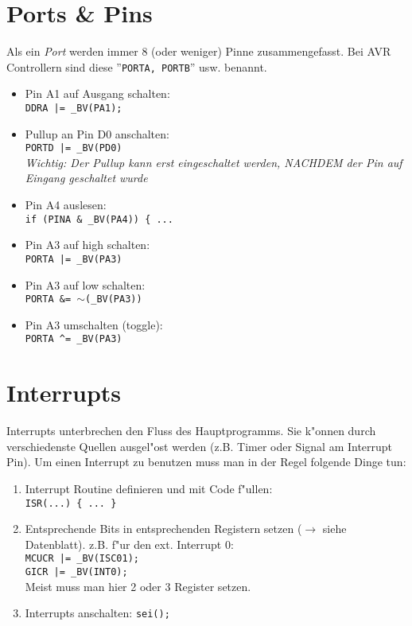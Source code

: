 \documentclass[11pt,a4paper,smallheadings,twocolumn,headexclude,footexclude]{scrartcl}
\begin{document}
\section*{Ports \& Pins}
Als ein \emph{Port} werden immer 8 (oder weniger) Pinne zusammengefasst. Bei AVR Controllern
sind diese ''\texttt{PORTA, PORTB}'' usw. benannt.
\begin{itemize}
	\item Pin A1 auf Ausgang schalten:\\\texttt{DDRA |= \_BV(PA1);}
	\item Pullup an Pin D0 anschalten: \\\texttt{PORTD |= \_BV(PD0)}
		\\\emph{Wichtig: Der Pullup kann erst eingeschaltet werden, NACHDEM
		der Pin auf Eingang geschaltet wurde}
	\item Pin A4 auslesen: \\\texttt{if (PINA \& \_BV(PA4)) \{ ... }
	\item Pin A3 auf high schalten:\\\texttt{PORTA |= \_BV(PA3)}
	\item Pin A3 auf low schalten:\\\texttt{PORTA \&= $\sim$(\_BV(PA3))}
	\item Pin A3 umschalten (toggle):\\\texttt{PORTA {\textasciicircum}= \_BV(PA3)}
\end{itemize}

\section*{Interrupts}
Interrupts unterbrechen den Fluss des Hauptprogramms. Sie k"onnen durch verschiedenste
Quellen ausgel"ost werden (z.B. Timer oder Signal am Interrupt Pin). Um einen Interrupt
zu benutzen muss man in der Regel folgende Dinge tun:
\begin{enumerate}
	\item Interrupt Routine definieren und mit Code f"ullen:
		\\\texttt{ISR(...) \{ ... \}}
	\item Entsprechende Bits in entsprechenden Registern setzen ($\rightarrow$ siehe Datenblatt).
		z.B. f"ur den ext. Interrupt 0:\\
		\texttt{MCUCR |= \_BV(ISC01);\\GICR |= \_BV(INT0);}
		\\
		Meist muss man hier 2 oder 3 Register setzen.
	\item Interrupts anschalten: \texttt{sei();}
\end{enumerate}
\end{document}
